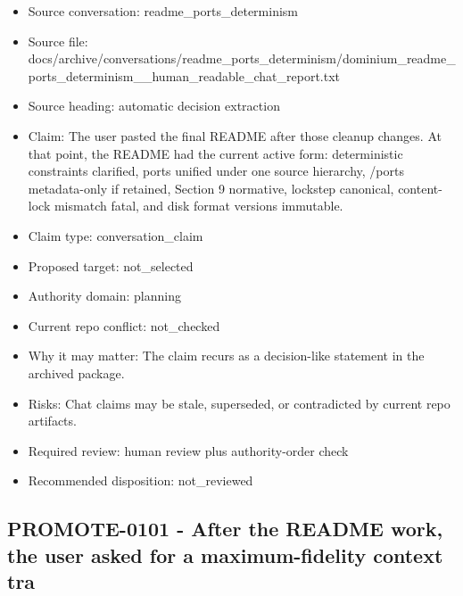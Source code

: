 \documentclass[11pt,a4paper]{report}
\begin{document}
\begin{itemize}
\item Source conversation: readme\_ports\_determinism
\item Source file: docs/archive/conversations/readme\_ports\_determinism/dominium\_readme\_ports\_determinism\_\_human\_readable\_chat\_report.txt
\item Source heading: automatic decision extraction
\item Claim: The user pasted the final README after those cleanup changes. At that point, the README had the current active form: deterministic constraints clarified, ports unified under one source hierarchy, /ports metadata-only if retained, Section 9 normative, lockstep canonical, content-lock mismatch fatal, and disk format versions immutable.
\item Claim type: conversation\_claim
\item Proposed target: not\_selected
\item Authority domain: planning
\item Current repo conflict: not\_checked
\item Why it may matter: The claim recurs as a decision-like statement in the archived package.
\item Risks: Chat claims may be stale, superseded, or contradicted by current repo artifacts.
\item Required review: human review plus authority-order check
\item Recommended disposition: not\_reviewed
\end{itemize}

\subsection{PROMOTE-0101 - After the README work, the user asked for a maximum-fidelity context tra}
\end{document}
